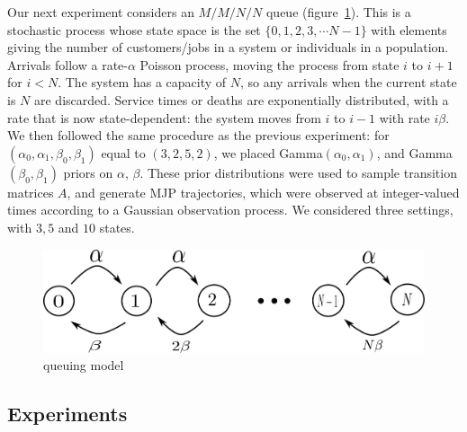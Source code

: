  Our next experiment considers an $M/M/N/N$ queue (figure~\ref{q_model}). This is a stochastic process 
whose state space is the set $\{0, 1, 2, 3, \cdots N - 1\}$ with elements
giving the number of customers/jobs in a system or individuals in a population. 
Arrivals follow a rate-$\alpha$ Poisson process, moving the process from state 
$i$ to $i+1$ for $i<N$. The system has a capacity of $N$, so any arrivals when 
the current state is $N$ are discarded.  Service times or deaths are 
exponentially distributed, with a rate that is now state-dependent:
the system moves from $i$ to $i - 1$ with rate $i\beta$. 
We then followed the same procedure as the previous experiment:
for $(\alpha_0,\alpha_1,\beta_0,\beta_1)$ equal to $(3,2,5,2)$,
we placed Gamma$(\alpha_0,\alpha_1)$, and Gamma$(\beta_0, \beta_1)$ priors on 
$\alpha$, $\beta$. These prior distributions were used to sample transition 
matrices $A$, and generate MJP trajectories, which were observed at integer-valued
times according to a Gaussian observation process.
We considered three settings, with $3, 5$ and $10$ states. 
  \begin{figure}
  \centering
  \begin{minipage}[hp]{0.6\linewidth}%
  \centering
    \includegraphics [width=1\textwidth, angle=0]{figs/queue_model.pdf}%
      \end{minipage}
    \caption{queuing model}
	\label{q_model}
  \end{figure}

\subsection{Experiments}


